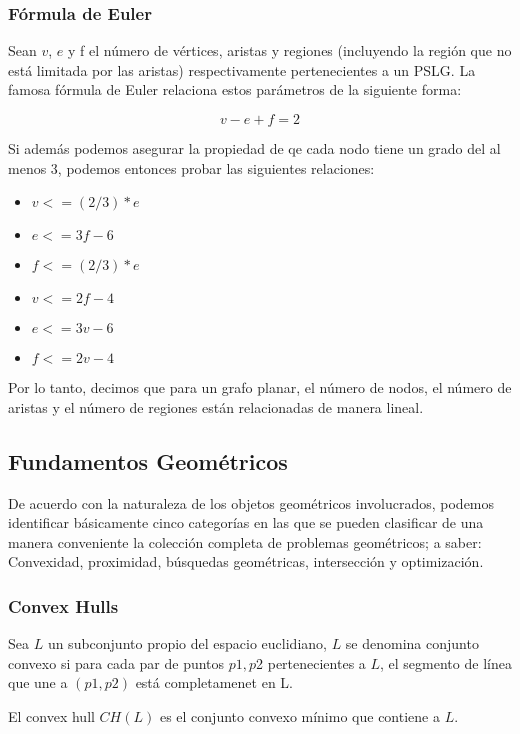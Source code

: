 \documentclass[final, 12pt letterpaper]{article}
\begin{document}
\subsubsection*{Fórmula de Euler}

Sean $v$, $e$ y f el número de vértices, aristas y regiones (incluyendo la región que no está limitada por las aristas) respectivamente pertenecientes a un PSLG. La famosa fórmula de Euler relaciona estos parámetros de la siguiente forma:

\[ v - e + f = 2 \]

Si además podemos asegurar la propiedad de qe cada nodo tiene un grado del al menos 3, podemos entonces probar las siguientes relaciones:
\begin{itemize}
\item $v <= (2/3)*e$
\item $e <= 3f -6$
\item $f <= (2/3)*e$
\item $v <= 2f -4$
\item $e <= 3v -6$
\item $f <= 2v -4$
\end{itemize}

Por lo tanto, decimos que para un grafo planar, el número de nodos, el número de aristas y el número de regiones están relacionadas de manera lineal.

\subsection{Fundamentos Geométricos}

De acuerdo con la naturaleza de los objetos geométricos involucrados, podemos identificar básicamente cinco categorías en las que se pueden clasificar de una manera conveniente la colección completa de problemas geométricos; a saber: Convexidad, proximidad, búsquedas geométricas, intersección y optimización.

\subsubsection{Convex Hulls}

Sea $L$ un subconjunto propio del espacio euclidiano, $L$ se denomina conjunto convexo si para cada par de puntos $p1, p$2 pertenecientes a $L$, el segmento de línea que une a $(p1, p2)$ está completamenet en L.

El convex hull $CH(L)$ es el conjunto convexo mínimo que contiene a $L$.
\end{document}

